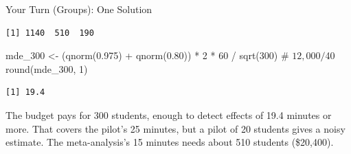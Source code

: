 \documentclass[
  ignorenonframetext,
  aspectratio=169,
]{beamer}
\newenvironment{Shaded}{\begin{snugshade}}{\end{snugshade}}
\newcommand{\AttributeTok}[1]{\textcolor[rgb]{0.40,0.45,0.13}{#1}}
\newcommand{\CommentTok}[1]{\textcolor[rgb]{0.37,0.37,0.37}{#1}}
\newcommand{\DecValTok}[1]{\textcolor[rgb]{0.68,0.00,0.00}{#1}}
\newcommand{\FloatTok}[1]{\textcolor[rgb]{0.68,0.00,0.00}{#1}}
\newcommand{\FunctionTok}[1]{\textcolor[rgb]{0.28,0.35,0.67}{#1}}
\newcommand{\NormalTok}[1]{\textcolor[rgb]{0.00,0.23,0.31}{#1}}
\newcommand{\OtherTok}[1]{\textcolor[rgb]{0.00,0.23,0.31}{#1}}
\newcommand{\SpecialCharTok}[1]{\textcolor[rgb]{0.37,0.37,0.37}{#1}}
\begin{document}
\begin{frame}[fragile]{Your Turn (Groups): One Solution}
\label{your-turn-groups-one-solution}
\begin{Shaded}
\end{Shaded}

\begin{verbatim}
[1] 1140  510  190
\end{verbatim}

\begin{Shaded}
\begin{Highlighting}[]
\NormalTok{mde\_300 }\OtherTok{\textless{}{-}}\NormalTok{ (}\FunctionTok{qnorm}\NormalTok{(}\FloatTok{0.975}\NormalTok{) }\SpecialCharTok{+} \FunctionTok{qnorm}\NormalTok{(}\FloatTok{0.80}\NormalTok{)) }\SpecialCharTok{*} \DecValTok{2} \SpecialCharTok{*} \DecValTok{60} \SpecialCharTok{/} \FunctionTok{sqrt}\NormalTok{(}\DecValTok{300}\NormalTok{) }\CommentTok{\# $12,000 / $40}
\FunctionTok{round}\NormalTok{(mde\_300, }\DecValTok{1}\NormalTok{)}
\end{Highlighting}
\end{Shaded}

\begin{verbatim}
[1] 19.4
\end{verbatim}

\footnotesize The budget pays for 300 students, enough to detect effects
of 19.4 minutes or more. That covers the pilot's 25 minutes, but a pilot
of 20 students gives a noisy estimate. The meta-analysis's 15 minutes
needs about 510 students (\$20,400).
\end{frame}
\end{document}
